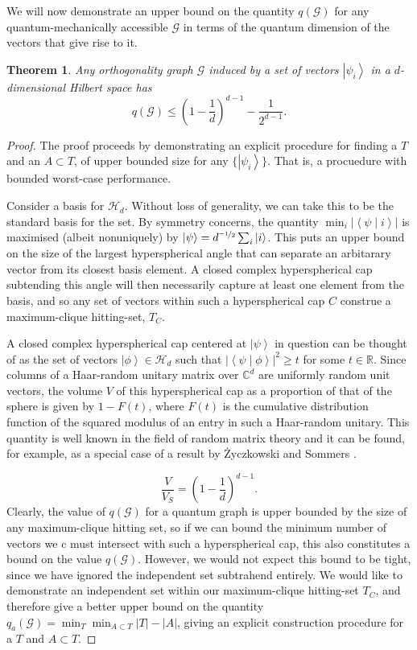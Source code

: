 \documentclass{amsart}
\newtheorem{thm}{Theorem}
\theoremstyle{definition}
\newcommand{\ket}[1]{{\left\vert{#1}\right\rangle}}
\newcommand{\braket}[2]{{\left< {#1} \middle\vert {#2}\right>}}
\newcommand{\sprod}[2]{\left|\left< {#1} \middle| {#2} \right>\right|}
\begin{document}
We will now demonstrate an upper bound on the quantity $q(\mathcal{G})$ for any quantum-mechanically accessible $\mathcal{G}$ in terms of the quantum dimension of the vectors that give rise to it.
\begin{thm}\label{main}
Any orthogonality graph $\mathcal{G}$ induced by a set of vectors $\ket{\psi_i}$ in a $d$-dimensional Hilbert space has
\begin{equation}
q(\mathcal{G}) \leq \left(1-\frac1d\right)^{d-1}-\frac{1}{2^{d-1}}.
\end{equation}
\end{thm}
\begin{proof}
The proof proceeds by demonstrating an explicit procedure for finding a $T$ and an $A\subset T$, of upper bounded size for any $\{\ket{\psi_i}\}$. That is, a procuedure with bounded worst-case performance.

Consider a basis for $\mathcal{H}_d$. Without loss of generality, we can take this to be the standard basis for the set. By symmetry concerns, the quantity $\min_i \left|\braket{\psi}{i}\right|$ is maximised (albeit nonuniquely) by $\ket{\psi}=d^{\nicefrac{-1}{2}}\sum_i\ket{i}$. This puts an upper bound on the size of the largest hyperspherical angle that can separate an arbitarary vector from its closest basis element. A closed complex hyperspherical cap subtending this angle will then necessarily capture at least one element from the basis, and so any set of vectors within such a hyperspherical cap $C$ construe a maximum-clique hitting-set, $T_C$.

A closed complex hyperspherical cap centered at $\ket{\psi}$ in question can be thought of as the set of vectors $\ket{\phi}\in\mathcal{H}_d$ such that $\sprod{\psi}{\phi}^2\geq t$ for some $t\in\mathbb{R}$. Since columns of a Haar-random unitary matrix over $\mathbb{C}^d$ are uniformly random unit vectors, the volume $V$ of this hyperspherical cap as a proportion of that of the sphere is given by $1-F(t)$, where $F(t)$ is the cumulative distribution function of the squared  modulus of an entry in such a Haar-random unitary. This quantity is well known in the field of random matrix theory and it can be found, for example, as a special case of a result by \.{Z}yczkowski and Sommers \cite{Zycz2000}.

\begin{equation}
\frac{V}{V_S}=\left(1-\frac1d \right)^{d-1}.
\end{equation}
Clearly, the value of $q(\mathcal{G})$ for a quantum graph is upper bounded by the size of any maximum-clique hitting set, so if we can bound the minimum number of vectors we c must intersect with such a hyperspherical cap, this also constitutes a bound on the value $q(\mathcal{G})$. However, we would not expect this bound to be tight, since we have ignored the independent set subtrahend entirely. We would like to demonstrate an independent set within our maximum-clique hitting-set $T_C$, and therefore give a better upper bound on the quantity $q_a(\mathcal{G})=\min_T \min_{A\subset T} |T|-|A|$, giving an explicit construction procedure for a $T$ and $A\subset T$.


\end{proof}
\end{document}
